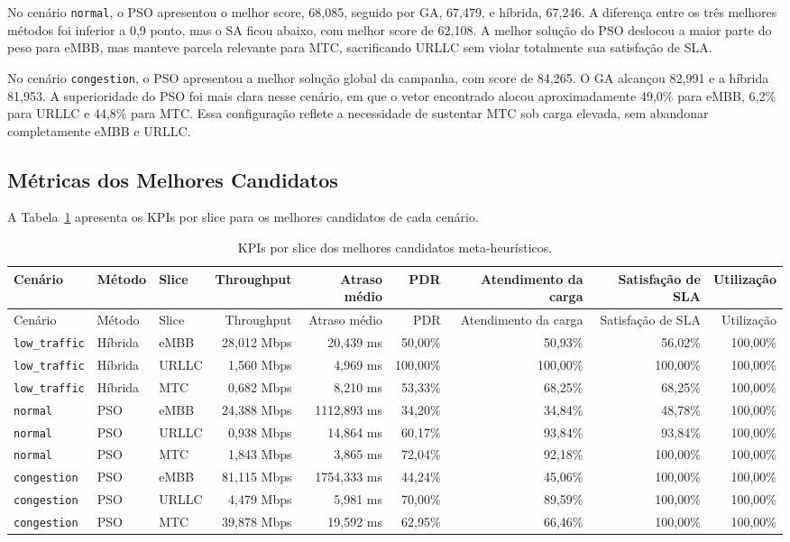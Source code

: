 \documentclass[12pt,a4paper]{article}
\begin{document}
No cenário \texttt{normal}, o PSO apresentou o melhor score, 68,085, seguido por GA, 67,479, e híbrida, 67,246. A diferença entre os três melhores métodos foi inferior a 0,9 ponto, mas o SA ficou abaixo, com melhor score de 62,108. A melhor solução do PSO deslocou a maior parte do peso para eMBB, mas manteve parcela relevante para MTC, sacrificando URLLC sem violar totalmente sua satisfação de SLA.

No cenário \texttt{congestion}, o PSO apresentou a melhor solução global da campanha, com score de 84,265. O GA alcançou 82,991 e a híbrida 81,953. A superioridade do PSO foi mais clara nesse cenário, em que o vetor encontrado alocou aproximadamente 49,0\% para eMBB, 6,2\% para URLLC e 44,8\% para MTC. Essa configuração reflete a necessidade de sustentar MTC sob carga elevada, sem abandonar completamente eMBB e URLLC.

\subsection{Métricas dos Melhores Candidatos}

A Tabela~\ref{tab:kpis} apresenta os KPIs por slice para os melhores candidatos de cada cenário.

\begin{landscape}
\scriptsize
\begin{longtable}{lllrrrrrr}
\caption{KPIs por slice dos melhores candidatos meta-heurísticos.}\label{tab:kpis}\\
\toprule
Cenário & Método & Slice & Throughput & Atraso médio & PDR & Atendimento da carga & Satisfação de SLA & Utilização \\
\midrule
\endfirsthead
\toprule
Cenário & Método & Slice & Throughput & Atraso médio & PDR & Atendimento da carga & Satisfação de SLA & Utilização \\
\midrule
\endhead
\texttt{low\_traffic} & Híbrida & eMBB & 28,012 Mbps & 20,439 ms & 50,00\% & 50,93\% & 56,02\% & 100,00\% \\
\texttt{low\_traffic} & Híbrida & URLLC & 1,560 Mbps & 4,969 ms & 100,00\% & 100,00\% & 100,00\% & 100,00\% \\
\texttt{low\_traffic} & Híbrida & MTC & 0,682 Mbps & 8,210 ms & 53,33\% & 68,25\% & 68,25\% & 100,00\% \\
\texttt{normal} & PSO & eMBB & 24,388 Mbps & 1112,893 ms & 34,20\% & 34,84\% & 48,78\% & 100,00\% \\
\texttt{normal} & PSO & URLLC & 0,938 Mbps & 14,864 ms & 60,17\% & 93,84\% & 93,84\% & 100,00\% \\
\texttt{normal} & PSO & MTC & 1,843 Mbps & 3,865 ms & 72,04\% & 92,18\% & 100,00\% & 100,00\% \\
\texttt{congestion} & PSO & eMBB & 81,115 Mbps & 1754,333 ms & 44,24\% & 45,06\% & 100,00\% & 100,00\% \\
\texttt{congestion} & PSO & URLLC & 4,479 Mbps & 5,981 ms & 70,00\% & 89,59\% & 100,00\% & 100,00\% \\
\texttt{congestion} & PSO & MTC & 39,878 Mbps & 19,592 ms & 62,95\% & 66,46\% & 100,00\% & 100,00\% \\
\bottomrule
\end{longtable}
\end{landscape}
\end{document}
